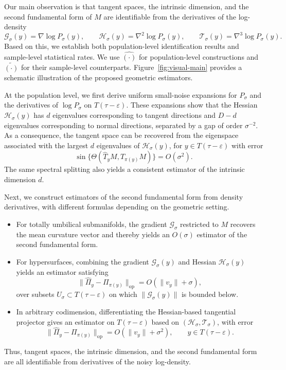 \documentclass[11pt]{article}
\theoremstyle{plain}
\theoremstyle{definition}
\begin{document}
Our main observation is that tangent spaces, the intrinsic dimension, and the second fundamental form of $M$ are identifiable from the derivatives of the log-density
\[
\mathcal G_\sigma(y) = \nabla\log P_\sigma(y),\qquad
\mathcal H_\sigma(y) = \nabla^2\log P_\sigma(y),\qquad
\mathcal T_\sigma(y) = \nabla^3\log P_\sigma(y).
\]
Based on this, we establish both population-level identification results and sample-level statistical rates. We use $\widehat{(\cdot)}$ for population-level constructions and $\widetilde{(\cdot)}$ for their sample-level counterparts.
Figure~\ref{fig:visual-main} provides a schematic illustration of the proposed geometric estimators.

At the population level, we first derive uniform small-noise expansions for $P_\sigma$ and the derivatives of $\log P_\sigma$ on $T(\tau-\varepsilon)$. 
These expansions show that the Hessian $\mathcal H_\sigma(y)$ has $d$ eigenvalues corresponding to tangent directions and $D-d$ eigenvalues corresponding to normal directions, separated by a gap of order $\sigma^{-2}$. As a consequence, the tangent space can be recovered from the eigenspace associated with the largest $d$ eigenvalues of $\mathcal H_\sigma(y)$, for $y\in T(\tau-\varepsilon)$ with error
\[
\sin\{\Theta(\widehat T_yM,T_{\pi(y)}M)\}=O(\sigma^2).
\]
The same spectral splitting also yields a consistent estimator of the intrinsic dimension $d$.

Next, we construct estimators of the second fundamental form from density derivatives, with different formulas depending on the geometric setting.
\begin{itemize}
  \item For totally umbilical submanifolds, the gradient $\mathcal G_\sigma$ restricted to $M$ recovers the mean curvature vector and thereby yields an $O(\sigma)$ estimator of the second fundamental form.
  \item For hypersurfaces, combining the gradient $\mathcal G_\sigma(y)$ and Hessian $\mathcal H_\sigma(y)$ yields an estimator satisfying
  \[
    \|\widehat\Pi_y-\Pi_{\pi(y)}\|_{\mathrm{op}}
    =O(\|v_y\|+\sigma),
  \]
  over subsets $U_\sigma\subset T(\tau-\varepsilon)$ on which $\|\mathcal G_\sigma(y)\|$ is bounded below.
  \item In arbitrary codimension, differentiating the Hessian-based tangential projector gives an estimator on $T(\tau-\varepsilon)$ based on $(\mathcal H_\sigma,\mathcal T_\sigma)$, with error
  \[
    \|\widehat\Pi_y-\Pi_{\pi(y)}\|_{\mathrm{op}}
    =O(\|v_y\|+\sigma^2),
    \qquad y\in T(\tau-\varepsilon).
  \]
\end{itemize}
Thus, tangent spaces, the intrinsic dimension, and the second fundamental form are all identifiable from derivatives of the noisy log-density.
\end{document}
